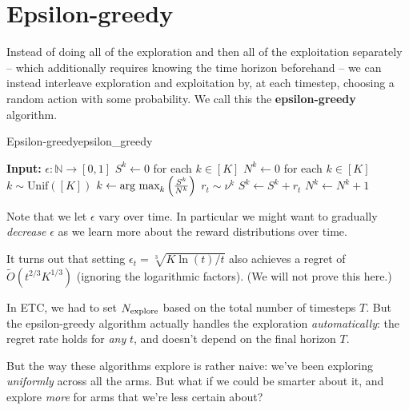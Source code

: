 \documentclass[\main/main]{subfiles}
\begin{document}
\section{Epsilon-greedy}

Instead of doing all of the exploration and then all of the exploitation separately -- which additionally requires knowing the time horizon beforehand -- we can instead interleave exploration and exploitation by, at each timestep, choosing a random action with some probability. We call this the \textbf{epsilon-greedy} algorithm.

\begin{definition}{Epsilon-greedy}{epsilon_greedy}
    \begin{algorithmic}
        \State \textbf{Input:} $\epsilon : \mathbb{N} \to [0, 1]$
        \State $S^k \gets 0$ for each $k \in [K]$ 
        \State $N^k \gets 0$ for each $k \in [K]$ 
        \State $k \sim \text{Unif}([K])$
        \Else
        \State $k \gets \operatorname*{\textrm{arg\ max}}_k \left(\frac{S^k}{N^k}\right)$
        \EndIf
        \State $r_t \sim \nu^k$
        \State $S^k \gets S^k + r_t$
        \State $N^k \gets N^k + 1$
        \EndFor
    \end{algorithmic}
\end{definition}

Note that we let $\epsilon$ vary over time. In particular we might want to gradually \emph{decrease} $\epsilon$ as we learn more about the reward distributions over time.

It turns out that setting $\epsilon_t = \sqrt[3]{K \ln(t)/t}$ also achieves a regret of $\tilde O(t^{2/3} K^{1/3})$ (ignoring the logarithmic factors). (We will not prove this here.)


In ETC, we had to set $N_{\text{explore}}$ based on the total number of timesteps $T$. But the epsilon-greedy algorithm actually handles the exploration \emph{automatically}: the regret rate holds for \emph{any} $t$, and doesn't depend on the final horizon $T$.

But the way these algorithms explore is rather naive: we've been exploring \emph{uniformly} across all the arms. But what if we could be smarter about it, and explore \emph{more} for arms that we're less certain about?
\end{document}
